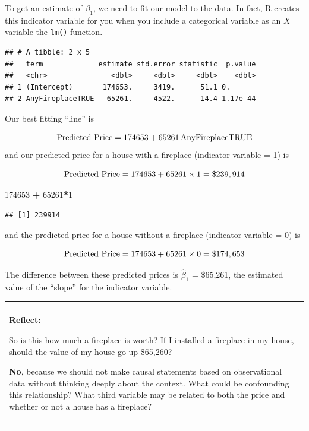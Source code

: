 \documentclass[
]{book}
\newenvironment{Shaded}{\begin{snugshade}}{\end{snugshade}}
\newcommand{\DecValTok}[1]{\textcolor[rgb]{0.00,0.00,0.81}{#1}}
\newcommand{\KeywordTok}[1]{\textcolor[rgb]{0.13,0.29,0.53}{\textbf{#1}}}
\newcommand{\NormalTok}[1]{#1}
\newcommand{\OperatorTok}[1]{\textcolor[rgb]{0.81,0.36,0.00}{\textbf{#1}}}
\newcommand{\StringTok}[1]{\textcolor[rgb]{0.31,0.60,0.02}{#1}}
\newenvironment{reflect}
{
    \begin{center}
    
    \begin{tabular}{|p{0.8\textwidth}|}
    \rowcolor{LightBlue}
    \hline\\
    \rowcolor{LightBlue}
    \textbf{Reflect:}
}
{
    \\\rowcolor{LightBlue}
    \\\hline
    \end{tabular} 
    \end{center}
}
\begin{document}
To get an estimate of \(\beta_1\), we need to fit our model to the data. In fact, R creates this indicator variable for you when you include a categorical variable as an \(X\) variable the \texttt{lm()} function.

\begin{Shaded}
\end{Shaded}

\begin{verbatim}
## # A tibble: 2 x 5
##   term             estimate std.error statistic  p.value
##   <chr>               <dbl>     <dbl>     <dbl>    <dbl>
## 1 (Intercept)       174653.     3419.      51.1 0.      
## 2 AnyFireplaceTRUE   65261.     4522.      14.4 1.17e-44
\end{verbatim}

Our best fitting ``line'' is

\[ \hbox{Predicted Price} = 174653 + 65261\,\hbox{AnyFireplaceTRUE} \]
and our predicted price for a house with a fireplace (indicator variable = 1) is

\[ \hbox{Predicted Price} = 174653 + 65261 \times 1 = \$ 239,914 \]

\begin{Shaded}
\begin{Highlighting}[]
\DecValTok{174653} \OperatorTok{+}\StringTok{ }\DecValTok{65261}\OperatorTok{*}\DecValTok{1}
\end{Highlighting}
\end{Shaded}

\begin{verbatim}
## [1] 239914
\end{verbatim}

and the predicted price for a house without a fireplace (indicator variable = 0) is

\[\hbox{Predicted Price} = 174653 + 65261 \times 0 = \$ 174,653\]

The difference between these predicted prices is \(\hat{\beta}_1\) = \$65,261, the estimated value of the ``slope'' for the indicator variable.

\begin{reflect}
So is this how much a fireplace is worth? If I installed a fireplace in
my house, should the value of my house go up \$65,260?

\textbf{No}, because we should not make causal statements based on
observational data without thinking deeply about the context. What could
be confounding this relationship? What third variable may be related to
both the price and whether or not a house has a fireplace?
\end{reflect}
\end{document}
